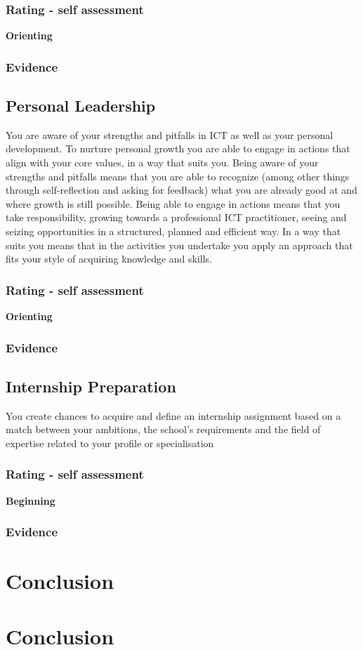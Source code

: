 \documentclass[a4paper, 11pt]{article}
\begin{document}
\subsubsection{Rating - self assessment}
\textbf{Orienting} 
\subsubsection{Evidence} 

\subsection{Personal Leadership}
You are aware of your strengths and pitfalls in ICT as well as your personal development. To nurture personal growth you are able to engage in actions that align with your core values, in a way that suits you.
\medbreak
Being aware of your strengths and pitfalls means that you are able to recognize (among other things through self-reflection and asking for feedback) what you are already good at and where growth is still possible.   Being able to engage in actions means that you take responsibility, growing towards a professional ICT practitioner, seeing and seizing opportunities in a structured, planned and efficient way. In a way that suits you means that in the activities you undertake you apply an approach that fits your style of acquiring knowledge and skills. 

\subsubsection{Rating - self assessment}
\textbf{Orienting} 
\subsubsection{Evidence}

\subsection{Internship Preparation}
You create chances to acquire and define an internship assignment based on a match between your ambitions, the school's requirements and the field of expertise related to your profile or specialisation

\subsubsection{Rating - self assessment}
\textbf{Beginning} 
\subsubsection{Evidence}



\section{Conclusion}


\section{Conclusion}
\end{document}
